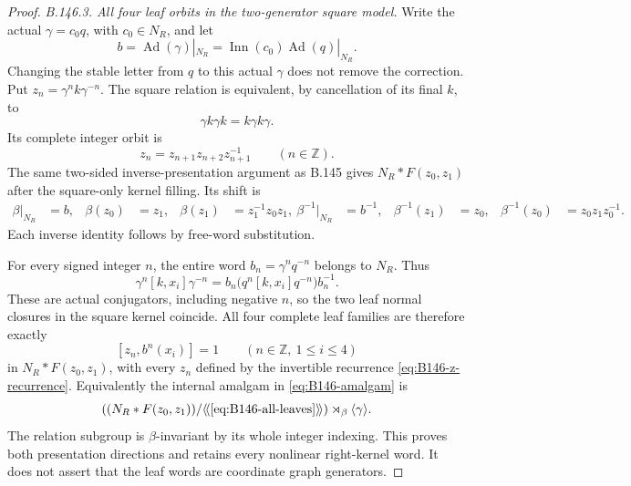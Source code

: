 \begin{proof}
\emph{B.146.3. All four leaf orbits in the two-generator square model.}
Write the actual $\gamma=c_0q$, with $c_0\in N_R$, and let
\[
 b=\operatorname{Ad}(\gamma)|_{N_R}
       =\operatorname{Inn}(c_0)\operatorname{Ad}(q)|_{N_R}.
\]
Changing the stable letter from $q$ to this actual $\gamma$ does
not remove the correction. Put $z_n=\gamma^nk\gamma^{-n}$.
The square relation is equivalent, by cancellation of its final
$k$, to
\[
 \gamma k\gamma k=k\gamma k\gamma.
\]
Its complete integer orbit is
\begin{equation}\label{eq:B146-z-recurrence}
 z_n=z_{n+1}z_{n+2}z_{n+1}^{-1}\qquad(n\in\mathbb Z).
\end{equation}
The same two-sided inverse-presentation argument as B.145 gives
$N_R*F(z_0,z_1)$ after the square-only kernel filling. Its shift is
\begin{equation}\label{eq:B146-shift}
\begin{aligned}
 \beta|_{N_R}&=b,&\beta(z_0)&=z_1,&
 \beta(z_1)&=z_1^{-1}z_0z_1,\
 \beta^{-1}|_{N_R}&=b^{-1},&\beta^{-1}(z_1)&=z_0,&
 \beta^{-1}(z_0)&=z_0z_1z_0^{-1}.
\end{aligned}
\end{equation}
Each inverse identity follows by free-word substitution.

For every signed integer $n$, the entire word
$b_n=\gamma^nq^{-n}$ belongs to $N_R$. Thus
\begin{equation}\label{eq:B146-leaf-conjugator}
 \gamma^n[k,x_i]\gamma^{-n}
    =b_n\bigl(q^n[k,x_i]q^{-n}\bigr)b_n^{-1}.
\end{equation}
These are actual conjugators, including negative $n$, so the two
leaf normal closures in the square kernel coincide. All four
complete leaf families are therefore exactly
\begin{equation}\label{eq:B146-all-leaves}
 [z_n,b^n(x_i)]=1\qquad(n\in\mathbb Z,\ 1\leq i\leq4)
\end{equation}
in $N_R*F(z_0,z_1)$, with every $z_n$ defined by the invertible
recurrence \eqref{eq:B146-z-recurrence}. Equivalently the internal
amalgam in \eqref{eq:B146-amalgam} is
\[
 \left((N_R*F(z_0,z_1))/
       \langle\!\langle\eqref{eq:B146-all-leaves}\rangle\!\rangle\right)
       \rtimes_\beta\langle\gamma\rangle.
\]
The relation subgroup is $\beta$-invariant by its whole integer
indexing. This proves both presentation directions and retains
every nonlinear right-kernel word. It does not assert that the
leaf words are coordinate graph generators.


\end{proof}
